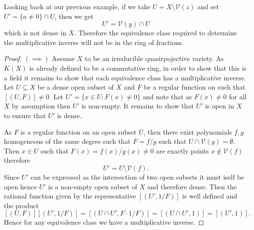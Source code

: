 \documentclass[40pt]{article}
\newcommand{\V}{\mathcal{V}}
\theoremstyle{remark}
\begin{document}
		Looking back at our previous example, if we take $U = X \setminus \V(z)$ and set $U' = \{a \neq 0\} \cap U$, then we get 
		\[
		U' = \V(y) \cap U
		\]
		which is not dense in $X$. Therefore the equivalence class required to determine the multiplicative inverse will not be in the ring of fractions. 
		\begin{proof}
			$(\implies)$ Assume $X$ to be an irreducible quasirpojective variety. As $K(X)$ is already defined to be a commutative ring, in order to show that this is a field it remains to show that each equivalence class has a multiplicative inverse. Let $U\subseteq X$ be a dense open subset of $X$ and $F$ be a regular function on such that $[(U,F)] \neq 0$. Let $U' = \{x \in U : F(x) \neq 0\}$ and note that as $F(x) \neq 0$ for all $X$ by assumption then $U'$ is non-empty. It remains to show that $U'$ is open in $X$ to ensure that $U'$ is dense. 
			
			As $F$ is a regular function on an open subset $U$, then there exist polynomials $f,g$ homogeneous of the same degree such that $F = f/g$ such that $U \cap \V(g) = \emptyset$. Then $x \in U$ such that $F(x) = f(x)/g(x) \neq 0$ are exactly points $x \not \in \V(f)$ therefore 
			\[
			U' = U \setminus \V(f).
			\]
			Since $U'$ can be expressed as the intersection of two open subsets it must iself be open hence $U'$ is a non-empty open subset of $X$ and therefore dense. Then the rational function given by the representative $[(U', 1/F)]$ is well defined and the product 
			\[
			[(U,F)][(U',1/F)] = [(U \cap U', F\cdot 1/F)] = [(U \cap U', 1)] = [(U', 1)].
			\]
			Hence for any equivalence class we have a multiplicative inverse. 
			

\end{proof}
\end{document}
